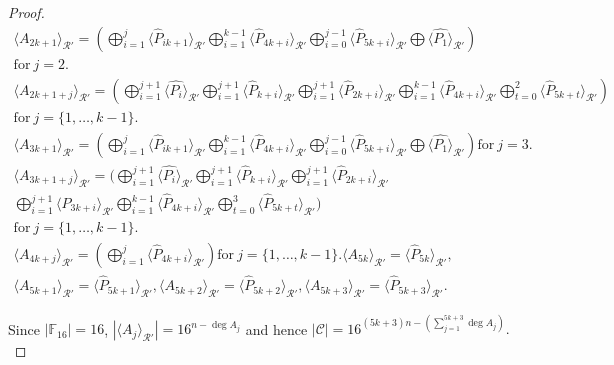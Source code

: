 \documentclass[10pt,a4paper]{amsart}
\begin{document}
\begin{proof}
\begin{gather*}
        \langle  A_{2k+1} \rangle_{\mathcal{R}'} =   \left( \bigoplus_{i=1}^{j} \langle \hat{P}_{ik+1} \rangle_{\mathcal{R}'} \bigoplus_{i=1}^{k-1} \langle \hat{P}_{4k+i} \rangle_{\mathcal{R}'} \bigoplus_{i=0}^{j-1} \langle \hat{P}_{5k+i} \rangle_{\mathcal{R}'} \bigoplus \langle \hat{P_{1}} \rangle_{\mathcal{R}'}  \right) \\ \text{for}~ j =2. \\
        \langle  A_{2k+1+j} \rangle_{\mathcal{R}'} = \left( \bigoplus_{i=1}^{j+1} \langle \hat{P_{i}} \rangle_{\mathcal{R}'} \bigoplus_{i=1}^{j+1} \langle \hat{P}_{k+i} \rangle_{\mathcal{R}'}  \bigoplus_{i=1}^{j+1} \langle \hat{P}_{2k+i} \rangle_{\mathcal{R}'} \bigoplus_{i=1}^{k-1} \langle \hat{P}_{4k+i} \rangle_{\mathcal{R}'} \bigoplus_{t=0}^{2} \langle \hat{P}_{5k+t} \rangle_{\mathcal{R}'}   \right) \\ \text{for} ~ j = \{1,\dots,k-1\}. \\
        \langle  A_{3k+1} \rangle_{\mathcal{R}'} =  \left( \bigoplus_{i=1}^{j} \langle \hat{P}_{ik+1} \rangle_{\mathcal{R}'} \bigoplus_{i=1}^{k-1} \langle \hat{P}_{4k+i} \rangle_{\mathcal{R}'} \bigoplus_{i=0}^{j-1} \langle \hat{P}_{5k+i} \rangle_{\mathcal{R}'} \bigoplus \langle \hat{P_{1}} \rangle_{\mathcal{R}'}  \right) \text{for}~ j =3. \\
        \langle  A_{3k+1+j} \rangle_{\mathcal{R}'} = ( \bigoplus_{i=1}^{j+1} \langle \hat{P_{i}} \rangle_{\mathcal{R}'} \bigoplus_{i=1}^{j+1} \langle \hat{P}_{k+i} \rangle_{\mathcal{R}'}  \bigoplus_{i=1}^{j+1} \langle \hat{P}_{2k+i} \rangle_{\mathcal{R}'} \\ \bigoplus_{i=1}^{j+1} \langle \hat{P}_{3k+i} \rangle_{\mathcal{R}'} \bigoplus_{i=1}^{k-1} \langle \hat{P}_{4k+i} \rangle_{\mathcal{R}'} \bigoplus_{t=0}^{3} \langle \hat{P}_{5k+t} \rangle_{\mathcal{R}'}   ) \\ \text{for} ~ j = \{1,\dots,k-1\}. \\
        \langle  A_{4k+j} \rangle_{\mathcal{R}'} = \left( \bigoplus_{i=1}^{j} \langle \hat{P}_{4k+i} \rangle_{\mathcal{R}'} \right) \text{for} ~ j = \{1,\dots,k-1\}.\langle  A_{5k} \rangle_{\mathcal{R}'} = \langle \hat{P}_{5k} \rangle_{\mathcal{R}'}, \\  \langle  A_{5k+1} \rangle_{\mathcal{R}'}= \langle \hat{P}_{5k+1} \rangle_{\mathcal{R}'} ,\langle  A_{5k+2} \rangle_{\mathcal{R}'} = \langle \hat{P}_{5k+2} \rangle_{\mathcal{R}'} ,\langle  A_{5k+3} \rangle_{\mathcal{R}'} =  \langle \hat{P}_{5k+3} \rangle_{\mathcal{R}'}.
    \end{gather*}

Since $|\mathbb F_{16}|=16$, $|\langle A_j \rangle_{\mathcal{R}'}|={16}^{n-\deg A_j}$ and hence
$|\mathcal{C}|=16^{(5k+3)n-( \sum_{j=1}^{5k+3}\deg A_j)}.$

\end{proof}
\end{document}
